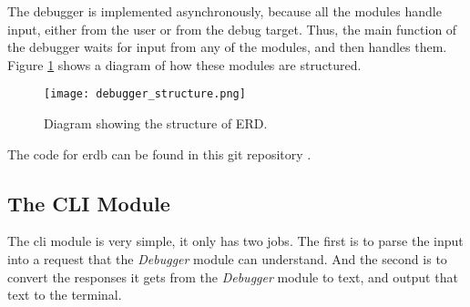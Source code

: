 The debugger is implemented asynchronously, because all the modules handle input, either from the user or from the debug target.
Thus, the main function of the debugger waits for input from any of the modules, and then handles them.
Figure \ref{fig:ERDStruct} shows a diagram of how these modules are structured.


\begin{figure}[h]
	\centering
	\texttt{[image: debugger\_structure.png]}
	\caption{Diagram showing the structure of ERD.}
	\label{fig:ERDStruct}
\end{figure}


The code for \gls{erdb} can be found in this git repository \cite{erdb}.


\subsection{The CLI Module} %
The \acrshort{cli} module is very simple, it only has two jobs.
The first is to parse the input into a request that the \emph{Debugger} module can understand.
And the second is to convert the responses it gets from the \emph{Debugger} module to text, and output that text to the terminal.


%
%
%
%
%
%




